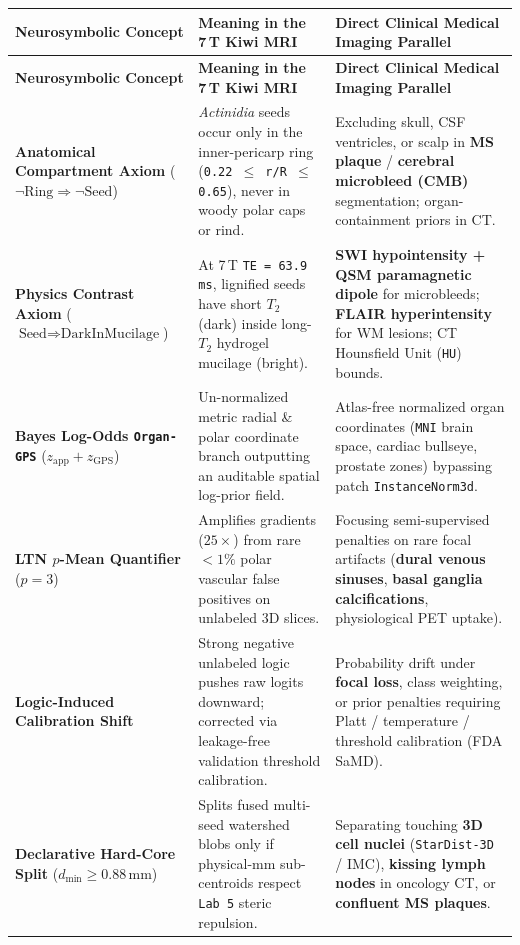\documentclass[10pt,a4paper]{article}
\begin{document}
{\footnotesize
\renewcommand{\arraystretch}{1.24}
\begin{xltabular}{\textwidth}{L{3.35cm} L{5.65cm} Y}
\toprule
{}\textbf{Neurosymbolic Concept} & \textbf{Meaning in the 7\,T Kiwi MRI} & \textbf{Direct Clinical Medical Imaging Parallel} \\
\midrule
\endfirsthead
\toprule
{}\textbf{Neurosymbolic Concept} & \textbf{Meaning in the 7\,T Kiwi MRI} & \textbf{Direct Clinical Medical Imaging Parallel} \\
\midrule
\endhead
\bottomrule
\endfoot
\textbf{Anatomical Compartment Axiom} ($\neg\text{Ring} \Rightarrow \neg\text{Seed}$) & \textit{Actinidia} seeds occur only in the inner-pericarp ring (\texttt{0.22 $\le$ r/R $\le$ 0.65}), never in woody polar caps or rind. & Excluding skull, CSF ventricles, or scalp in \textbf{MS plaque} / \textbf{cerebral microbleed (CMB)} segmentation; organ-containment priors in CT. \\
\textbf{Physics Contrast Axiom} ($\text{Seed} \Rightarrow \text{DarkInMucilage}$) & At 7\,T \texttt{TE = 63.9\,ms}, lignified seeds have short $T_2$ (dark) inside long-$T_2$ hydrogel mucilage (bright). & \textbf{SWI hypointensity + QSM paramagnetic dipole} for microbleeds; \textbf{FLAIR hyperintensity} for WM lesions; CT Hounsfield Unit (\texttt{HU}) bounds. \\
\textbf{Bayes Log-Odds \texttt{Organ-GPS}} ($z_{\text{app}} + z_{\text{GPS}}$) & Un-normalized metric radial \& polar coordinate branch outputting an auditable spatial log-prior field. & Atlas-free normalized organ coordinates (\texttt{MNI} brain space, cardiac bullseye, prostate zones) bypassing patch \texttt{InstanceNorm3d}. \\
\textbf{LTN $p$-Mean Quantifier} ($p = 3$) & Amplifies gradients ($25\times$) from rare $<1\%$ polar vascular false positives on unlabeled 3D slices. & Focusing semi-supervised penalties on rare focal artifacts (\textbf{dural venous sinuses}, \textbf{basal ganglia calcifications}, physiological PET uptake). \\
\textbf{Logic-Induced Calibration Shift} & Strong negative unlabeled logic pushes raw logits downward; corrected via leakage-free validation threshold calibration. & Probability drift under \textbf{focal loss}, class weighting, or prior penalties requiring Platt / temperature / threshold calibration (FDA SaMD). \\
\textbf{Declarative Hard-Core Split} ($d_{\min} \ge 0.88\,\text{mm}$) & Splits fused multi-seed watershed blobs only if physical-mm sub-centroids respect \texttt{Lab 5} steric repulsion. & Separating touching \textbf{3D cell nuclei} (\texttt{StarDist-3D} / IMC), \textbf{kissing lymph nodes} in oncology CT, or \textbf{confluent MS plaques}. \\
\end{xltabular}
}
\end{document}
